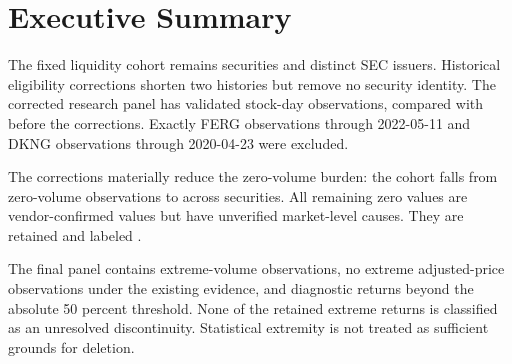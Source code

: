 \section{Executive Summary}

The fixed liquidity cohort remains \FinalSecurities{} securities and
\FinalIssuers{} distinct SEC issuers. Historical eligibility corrections shorten
two histories but remove no security identity. The corrected research panel has
\FinalObservations{} validated stock-day observations, compared with
\FilteredObservations{} before the corrections. Exactly \FergExcluded{} FERG
observations through 2022-05-11 and \DkngExcluded{} DKNG observations through
2020-04-23 were excluded.

The corrections materially reduce the zero-volume burden: the cohort falls from
\OriginalZeroVolumeRows{} zero-volume observations to \FinalZeroVolumeRows{}
across \FinalZeroVolumeSecurities{} securities. All remaining zero values are
vendor-confirmed values but have unverified market-level causes. They are
retained and labeled .

The final panel contains \FinalExtremeVolumeRows{} extreme-volume observations,
no extreme adjusted-price observations under the existing evidence, and
\FinalExtremeReturnRows{} diagnostic returns beyond the absolute 50 percent
threshold. None of the retained extreme returns is classified as an unresolved
discontinuity. Statistical extremity is not treated as sufficient grounds for
deletion.
